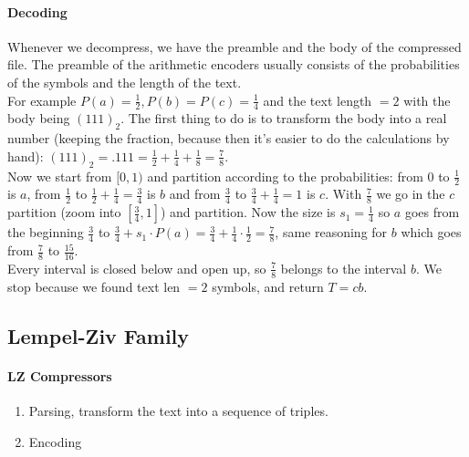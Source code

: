 \documentclass[10pt]{report}
\begin{document}
\paragraph{Decoding} Whenever we decompress, we have the preamble and the body of the compressed file. The preamble of the arithmetic encoders usually consists of the probabilities of the symbols and the length of the text.\\
For example $P(a) =\frac{1}{2}, P(b)=P(c)=\frac{1}{4}$ and the text length $= 2$ with the body being $(111)_2$. The first thing to do is to transform the body into a real number (keeping the fraction, because then it's easier to do the calculations by hand): $(111)_2 = .111 = \frac{1}{2} + \frac{1}{4} + \frac{1}{8} = \frac{7}{8}$.\\
Now we start from $[0,1)$ and partition according to the probabilities: from $0$ to $\frac{1}{2}$ is $a$, from $\frac{1}{2}$ to $\frac{1}{2}+\frac{1}{4}=\frac{3}{4}$ is $b$ and from $\frac{3}{4}$ to $\frac{3}{4} +\frac{1}{4} = 1$ is $c$. With $\frac{7}{8}$ we go in the $c$ partition (zoom into $[\frac{3}{4},1]$) and partition. Now the size is $s_1 = \frac{1}{4}$ so $a$ goes from the beginning $\frac{3}{4}$ to $\frac{3}{4} + s_1\cdot P(a) = \frac{3}{4} + \frac{1}{4}\cdot\frac{1}{2} = \frac{7}{8}$, same reasoning for $b$ which goes from $\frac{7}{8}$ to $\frac{15}{16}$.\\
Every interval is closed below and open up, so $\frac{7}{8}$ belongs to the interval $b$. We stop because we found text len $=2$ symbols, and return $T=cb$.
\subsection{Lempel-Ziv Family}
\paragraph{LZ Compressors}
\begin{enumerate}
	\item Parsing, transform the text into a sequence of triples.
	\item Encoding
\end{enumerate}
\end{document}
